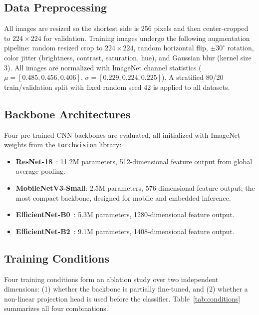 \documentclass[conference]{IEEEtran}
\begin{document}
\subsection{Data Preprocessing}

All images are resized so the shortest side is 256 pixels and then
center-cropped to $224 \times 224$ for validation.
Training images undergo the following augmentation pipeline:
random resized crop to $224 \times 224$,
random horizontal flip,
$\pm 30^{\circ}$ rotation,
color jitter (brightness, contrast, saturation, hue),
and Gaussian blur (kernel size 3).
All images are normalized with ImageNet channel statistics
($\mu = [0.485, 0.456, 0.406]$, $\sigma = [0.229, 0.224, 0.225]$).
A stratified 80/20 train/validation split with fixed random seed 42
is applied to all datasets.

\subsection{Backbone Architectures}

Four pre-trained CNN backbones are evaluated, all initialized with
ImageNet weights from the \texttt{torchvision} library:

\begin{itemize}
    \item \textbf{ResNet-18}~\cite{he2016resnet}: 11.2M parameters,
    512-dimensional feature output from global average pooling.
    \item \textbf{MobileNetV3-Small}: 2.5M parameters,
    576-dimensional feature output; the most compact backbone, designed
    for mobile and embedded inference.
    \item \textbf{EfficientNet-B0}~\cite{tan2019efficientnet}: 5.3M
    parameters, 1280-dimensional feature output.
    \item \textbf{EfficientNet-B2}~\cite{tan2019efficientnet}: 9.1M
    parameters, 1408-dimensional feature output.
\end{itemize}

\subsection{Training Conditions}

Four training conditions form an ablation study over two independent
dimensions: (1) whether the backbone is partially fine-tuned, and
(2) whether a non-linear projection head is used before the classifier.
Table~\ref{tab:conditions} summarizes all four combinations.
\end{document}
